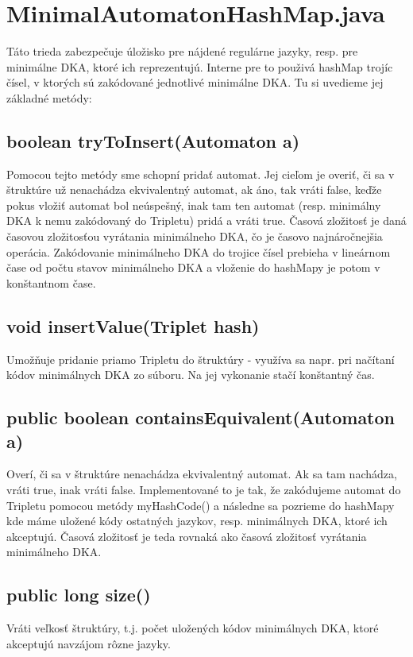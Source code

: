 \section{MinimalAutomatonHashMap.java}
Táto trieda zabezpečuje úložisko pre nájdené regulárne jazyky, resp. pre minimálne DKA, ktoré ich reprezentujú. Interne pre to použivá hashMap trojíc čísel, v ktorých sú zakódované jednotlivé minimálne DKA. Tu si uvedieme jej základné metódy:

\subsection*{boolean tryToInsert(Automaton a)}
Pomocou tejto metódy sme schopní pridať automat. Jej cieľom je overiť, či sa v štruktúre už nenachádza ekvivalentný automat, ak áno, tak vráti false, keďže pokus vložiť automat bol neúspešný, inak tam ten automat (resp. minimálny DKA k nemu zakódovaný do Tripletu) pridá a vráti true. Časová zložitosť je daná časovou zložitosťou vyrátania minimálneho DKA, čo je časovo najnáročnejšia operácia. Zakódovanie minimálneho DKA do trojice čísel prebieha v lineárnom čase od počtu stavov minimálneho DKA a vloženie do hashMapy je potom v konštantnom čase.

\subsection*{void insertValue(Triplet hash)}
Umožňuje pridanie priamo Tripletu do štruktúry - využíva sa napr. pri načítaní kódov minimálnych DKA zo súboru. Na jej vykonanie stačí konštantný čas.

\subsection*{public boolean containsEquivalent(Automaton a)}
Overí, či sa v štruktúre nenachádza ekvivalentný automat. Ak sa tam nachádza, vráti true, inak vráti false. Implementované to je tak, že zakódujeme automat do Tripletu pomocou metódy myHashCode() a následne sa pozrieme do hashMapy kde máme uložené kódy ostatných jazykov, resp. minimálnych DKA, ktoré ich akceptujú. Časová zložitosť je teda rovnaká ako časová zložitosť vyrátania minimálneho DKA.

\subsection*{public long size()}
Vráti veľkosť štruktúry, t.j. počet uložených kódov minimálnych DKA, ktoré akceptujú navzájom rôzne jazyky.

